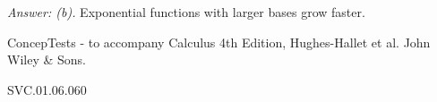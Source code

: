{\it Answer: (b).} Exponential functions with larger bases grow faster.

\medskip
ConcepTests - to accompany Calculus 4th Edition, Hughes-Hallet et al. John Wiley \& Sons.

SVC.01.06.060



